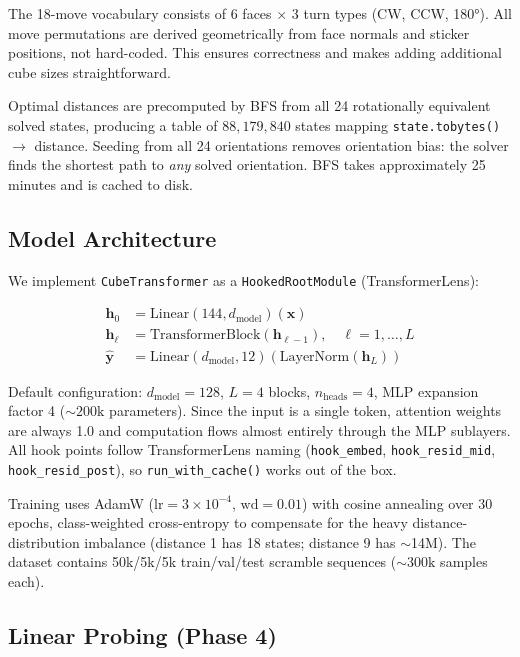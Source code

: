 \documentclass[12pt]{article}
\begin{document}
The 18-move vocabulary consists of 6 faces $\times$ 3 turn types (CW, CCW,
180°).  All move permutations are derived geometrically from face normals and
sticker positions, not hard-coded.  This ensures correctness and makes adding
additional cube sizes straightforward.

Optimal distances are precomputed by BFS from all 24 rotationally equivalent
solved states, producing a table of $88{,}179{,}840$ states mapping
\texttt{state.tobytes()} $\to$ distance.  Seeding from all 24 orientations
removes orientation bias: the solver finds the shortest path to \emph{any}
solved orientation.  BFS takes approximately 25 minutes and is cached to disk.

\subsection{Model Architecture}

We implement \texttt{CubeTransformer} as a \texttt{HookedRootModule} (TransformerLens):

\begin{align*}
\mathbf{h}_0 &= \text{Linear}(144, d_\text{model})(\mathbf{x}) \\
\mathbf{h}_\ell &= \text{TransformerBlock}(\mathbf{h}_{\ell-1}), \quad \ell = 1,\ldots,L \\
\hat{\mathbf{y}} &= \text{Linear}(d_\text{model}, 12)(\text{LayerNorm}(\mathbf{h}_L))
\end{align*}

Default configuration: $d_\text{model}{=}128$, $L{=}4$ blocks, $n_\text{heads}{=}4$,
MLP expansion factor 4 (${\sim}200\text{k}$ parameters).  Since the input is a
single token, attention weights are always 1.0 and computation flows almost
entirely through the MLP sublayers.  All hook points follow TransformerLens
naming (\texttt{hook\_embed}, \texttt{hook\_resid\_mid},
\texttt{hook\_resid\_post}), so \texttt{run\_with\_cache()} works out of the box.

Training uses AdamW ($\text{lr}{=}3{\times}10^{-4}$, $\text{wd}{=}0.01$) with
cosine annealing over 30 epochs, class-weighted cross-entropy to compensate for
the heavy distance-distribution imbalance (distance 1 has 18 states; distance 9
has $\sim$14M).  The dataset contains 50k/5k/5k train/val/test scramble
sequences (${\sim}300\text{k}$ samples each).

\subsection{Linear Probing (Phase 4)}
\end{document}
